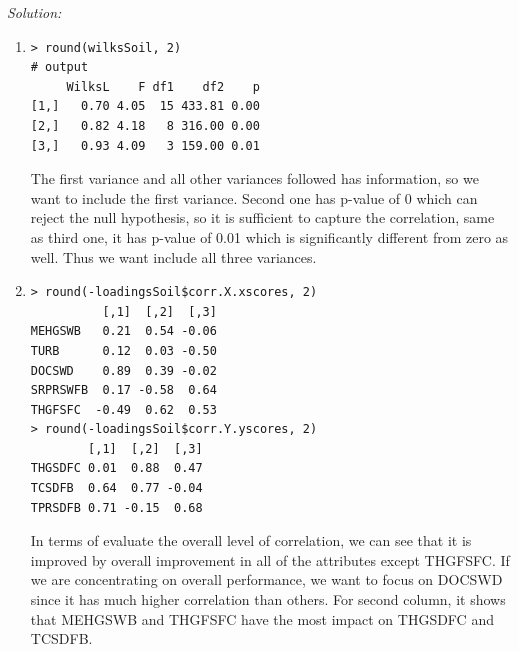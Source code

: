 \documentclass{article}
\newenvironment{solution}
    {\textit{Solution:}}
    {}
\begin{document}
\begin{solution}
\begin{enumerate}
	\item\mbox{}
		\begin{lstlisting}
> round(wilksSoil, 2)
# output
     WilksL    F df1    df2    p
[1,]   0.70 4.05  15 433.81 0.00
[2,]   0.82 4.18   8 316.00 0.00
[3,]   0.93 4.09   3 159.00 0.01
	\end{lstlisting}
The first variance and all other variances followed has information, so we want to include the first variance. Second one has p-value of 0 which can reject the null hypothesis, so it is sufficient to capture the correlation, same as third one, it has p-value of 0.01 which is significantly different from zero as well. Thus we want include all three variances.
\newpage
	\item\mbox{}
		\begin{lstlisting}
> round(-loadingsSoil$corr.X.xscores, 2)
          [,1]  [,2]  [,3]
MEHGSWB   0.21  0.54 -0.06
TURB      0.12  0.03 -0.50
DOCSWD    0.89  0.39 -0.02
SRPRSWFB  0.17 -0.58  0.64
THGFSFC  -0.49  0.62  0.53
> round(-loadingsSoil$corr.Y.yscores, 2)
        [,1]  [,2]  [,3]
THGSDFC 0.01  0.88  0.47
TCSDFB  0.64  0.77 -0.04
TPRSDFB 0.71 -0.15  0.68
	\end{lstlisting}
In terms of evaluate the overall level of correlation, we can see that it is improved by overall improvement in all of the attributes except THGFSFC. If we are concentrating on overall performance, we want to focus on DOCSWD since it has much higher correlation than others. For second column, it shows that MEHGSWB and THGFSFC have the most impact on THGSDFC and TCSDFB.
\end{enumerate}
\end{solution}
\end{document}
